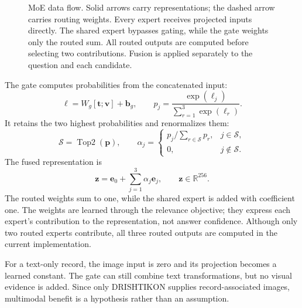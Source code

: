 \documentclass[10pt,a4paper]{article}
\newcommand{\R}{\mathbb{R}}
\begin{document}
\begin{figure}[htbp]
{}
\caption{MoE data flow. Solid arrows carry representations; the dashed arrow carries routing weights. Every expert receives projected inputs directly. The shared expert bypasses gating, while the gate weights only the routed sum. All routed outputs are computed before selecting two contributions. Fusion is applied separately to the question and each candidate.}
\label{fig:moe}
\end{figure}

The gate computes probabilities from the concatenated input:
\begin{equation}
\boldsymbol{\ell}=W_g[\mathbf{t};\mathbf{v}]+\mathbf{b}_g,\qquad
p_j=\frac{\exp(\ell_j)}{\sum_{r=1}^{3}\exp(\ell_r)}.
\end{equation}
It retains the two highest probabilities and renormalizes them:
\begin{equation}
\mathcal S=\operatorname{Top2}(\mathbf p),\qquad
\alpha_j=\begin{cases}p_j/\sum_{r\in\mathcal S}p_r,&j\in\mathcal S,\\0,&j\notin\mathcal S.\end{cases}
\end{equation} The fused representation is
\begin{equation}
\mathbf{z}=\mathbf{e}_0+\sum_{j=1}^{3}\alpha_j\mathbf{e}_j,\qquad
\mathbf{z}\in\R^{256}.
\end{equation}
The routed weights sum to one, while the shared expert is added with coefficient one. The weights are learned through the relevance objective; they express each expert's contribution to the representation, not answer confidence. Although only two routed experts contribute, all three routed outputs are computed in the current implementation.

For a text-only record, the image input is zero and its projection becomes a learned constant. The gate can still combine text transformations, but no visual evidence is added. Since only DRISHTIKON supplies record-associated images, multimodal benefit is a hypothesis rather than an assumption.
\end{document}
